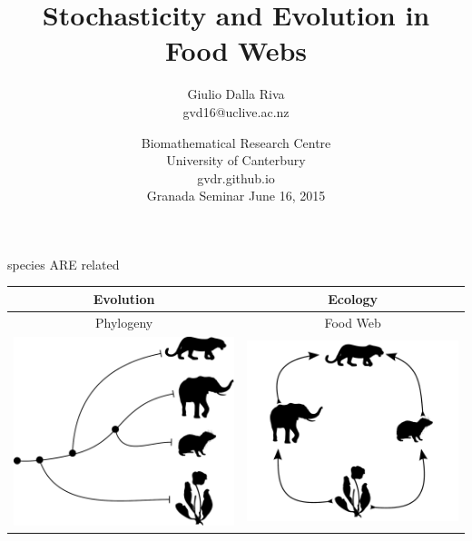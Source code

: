 \documentclass[]{beamer}
\title{Stochasticity and Evolution in Food Webs}
\author{Giulio Dalla Riva\\
\tiny{gvd16@uclive.ac.nz}\\
}
\date{  {\tiny Biomathematical Research Centre\\
  University of Canterbury\\
     gvdr.github.io\\
     \vskip 0.5cm
  }
Granada Seminar June 16, 2015}
\begin{document}
\frame{\titlepage
\addtocounter{framenumber}{-1}}

\begin{frame}{species ARE related}

\centering
\begin{tabular}{|c|c|}\hline
Evolution & Ecology \\\hline\hline
Phylogeny & Food Web \\
\includegraphics[width=0.4 \textwidth]{images/small_phylo.pdf} & \includegraphics[width=0.4 \textwidth]{images/small_fw.pdf} \\ \hline
\end{tabular}

\end{frame}
\end{document}
